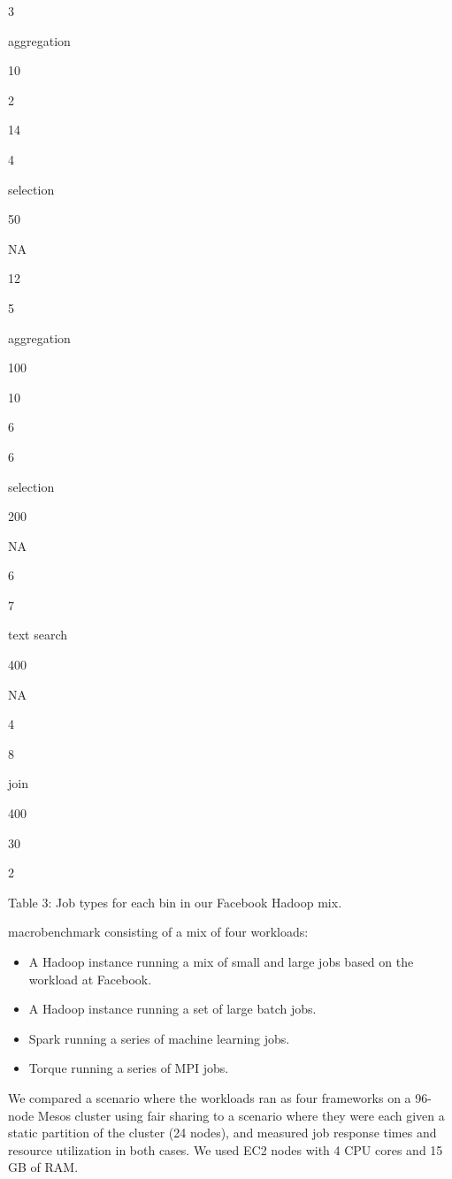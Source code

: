 \documentclass[
]{article}
\providecommand{\tightlist}{%
  \setlength{\itemsep}{0pt}\setlength{\parskip}{0pt}}
\begin{document}
3

aggregation

10

2

14

4

selection

50

NA

12

5

aggregation

100

10

6

6

selection

200

NA

6

7

text search

400

NA

4

8

join

400

30

2

Table 3: Job types for each bin in our Facebook Hadoop mix.

macrobenchmark consisting of a mix of four workloads:

\begin{itemize}
\tightlist
\item
  A Hadoop instance running a mix of small and large jobs based on the
  workload at Facebook.\\
\item
  A Hadoop instance running a set of large batch jobs.\\
\item
  Spark running a series of machine learning jobs.\\
\item
  Torque running a series of MPI jobs.
\end{itemize}

We compared a scenario where the workloads ran as four frameworks on a
96-node Mesos cluster using fair sharing to a scenario where they were
each given a static partition of the cluster (24 nodes), and measured
job response times and resource utilization in both cases. We used EC2
nodes with 4 CPU cores and 15 GB of RAM.
\end{document}
